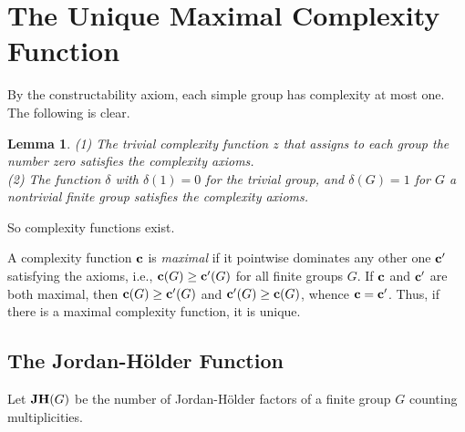 \documentclass[a4paper,11pt]{amsart}
\newtheorem{lemma}[theorem]{Lemma}
\theoremstyle{definition}
\renewcommand{\c}{\mbox{\bf c}}
\newcommand{\JH}{{\bf JH}}
\newcommand{\1}{{\mathbf 1}}
\begin{document}
\section{The Unique Maximal Complexity Function}

By the constructability axiom,  each simple group has complexity at most one. 
The following is clear.
\begin{lemma}\label{trivial}
(1) The trivial complexity function $z$ that assigns to each group the number zero satisfies the complexity axioms.\\
(2) 
The function $\delta$ with $\delta(1)=0$ for the trivial group, and $\delta(G)=1$ for $G$ a nontrivial finite group satisfies the complexity axioms.
\end{lemma}
So complexity functions exist.



A complexity function $\c$ is {\em maximal} if it pointwise dominates any other one $\c'$ satisfying the axioms, i.e.,
$\c(G) \geq \c'(G)$ for all finite groups $G$.   If $\c$ and $\c'$ are both maximal, then $\c(G) \geq \c'(G)$ and $\c'(G) \geq \c(G)$, whence $\c=\c'$. Thus, if there is a maximal complexity function, it is unique.   



\subsection{The Jordan-Hölder Function}

Let $\JH(G)$ be the number of Jordan-Hölder factors of a finite group $G$ counting multiplicities.  
\end{document}
